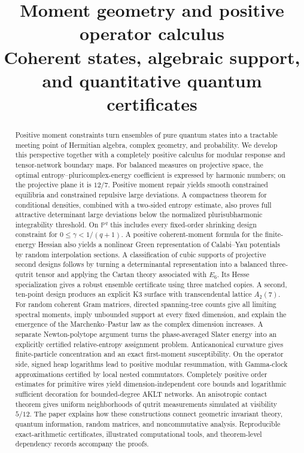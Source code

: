 \documentclass[11pt]{article}
\title{Moment geometry and positive operator calculus\\[5pt]
\large Coherent states, algebraic support, and quantitative quantum certificates}
\author{}
\date{}
\begin{document}
\maketitle
\begin{abstract}
Positive moment constraints turn ensembles of pure quantum states into a
tractable meeting point of Hermitian algebra, complex geometry, and probability.
We develop this perspective together with a completely positive calculus for
modular response and tensor-network boundary maps. For balanced measures on
projective space, the optimal entropy--pluricomplex-energy coefficient is
expressed by harmonic numbers; on the projective plane it is $12/7$.
Positive moment repair yields smooth constrained equilibria and constrained
repulsive large deviations. A compactness theorem for conditional densities,
combined with a two-sided entropy estimate, also proves full attractive
determinant large deviations below the normalized plurisubharmonic
integrability threshold. On $\mathbb P^q$ this includes every fixed-order
shrinking design constraint for $0\le\gamma<1/(q+1)$.
A positive coherent-moment formula for the finite-energy Hessian also
yields a nonlinear Green representation of Calabi--Yau potentials by
random interpolation sections.
A classification of cubic supports of projective second designs follows by
turning a determinantal representation into a balanced three-qutrit tensor
and applying the Cartan theory associated with $E_6$. Its Hesse specialization
gives a robust ensemble certificate using three matched copies. A second,
ten-point design produces an explicit K3 surface with transcendental lattice
$A_2(7)$. For random coherent Gram matrices, directed spanning-tree counts
give all limiting spectral moments, imply unbounded support at every fixed
dimension, and explain the emergence of the
Marchenko--Pastur law as the complex dimension increases.
A separate Newton-polytope argument turns the phase-averaged Slater energy
into an explicitly certified relative-entropy assignment problem.
Anticanonical curvature gives finite-particle concentration and an exact
first-moment susceptibility.
On the operator side, signed heap logarithms lead to positive modular
resummation, with Gamma-clock approximations certified by local nested
commutators. Completely positive order estimates for primitive wires yield
dimension-independent core bounds and logarithmic sufficient decoration for
bounded-degree AKLT networks. An anisotropic contact theorem gives uniform
neighborhoods of qutrit measurements simulated at visibility $5/12$.
The paper explains how these constructions
connect geometric invariant theory, quantum information, random matrices,
and noncommutative analysis. Reproducible exact-arithmetic certificates,
illustrated computational tools, and theorem-level dependency records
accompany the proofs.
\end{abstract}
\end{document}
